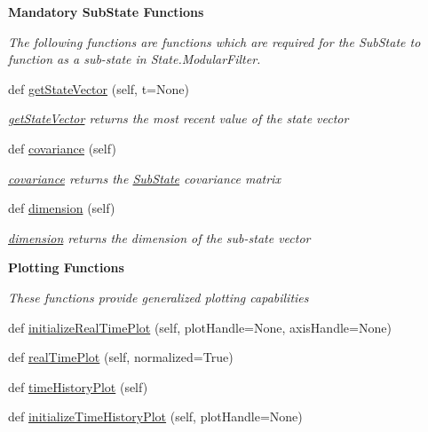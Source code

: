 \begin{Indent}{\bf Mandatory Sub\+State Functions}\par
{\em The following functions are functions which are required for the Sub\+State to function as a sub-\/state in State.\+Modular\+Filter. }\begin{DoxyCompactItemize}
\item 
def \hyperlink{classmodest_1_1substates_1_1substate_1_1SubState_a1d8050de59c58969164f577899a55aa2}{get\+State\+Vector} (self, t=None)
\begin{DoxyCompactList}\small\item\em \hyperlink{classmodest_1_1substates_1_1substate_1_1SubState_a1d8050de59c58969164f577899a55aa2}{get\+State\+Vector} returns the most recent value of the state vector \end{DoxyCompactList}\item 
def \hyperlink{classmodest_1_1substates_1_1substate_1_1SubState_a6e308aadd13962e476d2892ec728e3a5}{covariance} (self)
\begin{DoxyCompactList}\small\item\em \hyperlink{classmodest_1_1substates_1_1substate_1_1SubState_a6e308aadd13962e476d2892ec728e3a5}{covariance} returns the \hyperlink{classmodest_1_1substates_1_1substate_1_1SubState}{Sub\+State} covariance matrix \end{DoxyCompactList}\item 
def \hyperlink{classmodest_1_1substates_1_1substate_1_1SubState_ab9027f6d1d7d57c47731612f519b7ee6}{dimension} (self)
\begin{DoxyCompactList}\small\item\em \hyperlink{classmodest_1_1substates_1_1substate_1_1SubState_ab9027f6d1d7d57c47731612f519b7ee6}{dimension} returns the dimension of the sub-\/state vector \end{DoxyCompactList}\end{DoxyCompactItemize}
\end{Indent}
\begin{Indent}{\bf Plotting Functions}\par
{\em These functions provide generalized plotting capabilities }\begin{DoxyCompactItemize}
\item 
def \hyperlink{classmodest_1_1substates_1_1substate_1_1SubState_a1adac64be88eab0a64bb952518c4268f}{initialize\+Real\+Time\+Plot} (self, plot\+Handle=None, axis\+Handle=None)
\item 
def \hyperlink{classmodest_1_1substates_1_1substate_1_1SubState_a2deb7d1ca3105eb20e50fa7e67298355}{real\+Time\+Plot} (self, normalized=True)
\item 
def \hyperlink{classmodest_1_1substates_1_1substate_1_1SubState_a643678c1193dd4029683a437e84229ac}{time\+History\+Plot} (self)
\item 
def \hyperlink{classmodest_1_1substates_1_1substate_1_1SubState_a1853d44036e3ed35ada02414ea29f8ab}{initialize\+Time\+History\+Plot} (self, plot\+Handle=None)
\end{DoxyCompactItemize}
\end{Indent}
